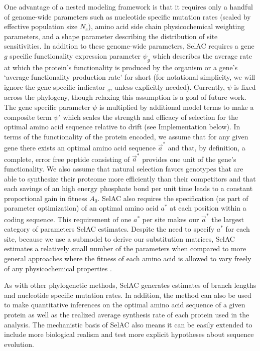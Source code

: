 \documentclass[onecolumn,letterpaper,fleqn,nogrid]{myMBE}%
\newcommand{\PC}{physicochemical\xspace}
\newcommand{\Ne}{\ensuremath{{N_e}}\xspace} %
\newcommand{\selac}{SelAC\xspace}
\newcommand{\aopt}{\ensuremath{a^*}\xspace}
\newcommand{\aoptvec}{\ensuremath{\Vec{a}^*}\xspace}
\newcommand{\psig}{\ensuremath{\psi_{g}}\xspace}
\newcommand{\psiprime}{\ensuremath{\psi'}\xspace}
\begin{document}
One advantage of a nested modeling framework is that it requires only a handful of genome-wide parameters such as nucleotide specific mutation rates (scaled by effective population size \Ne), amino acid side chain physicochemical weighting parameters, and a shape parameter describing the distribution of site sensitivities.
In addition to these genome-wide parameters, \selac requires a gene $g$ specific functionality expression parameter $\psig$ which describes the average rate at which the protein's functionality is produced by the organism or a gene's `average functionality production rate' for short (for notational simplicity, we will ignore the gene specific indicator $_g$, unless explicitly needed).
Currently, $\psi$ is fixed across the phylogeny, though relaxing this assumption is a goal of future work.
The gene specific parameter $\psi$ is multiplied by additional model terms to make a composite term $\psiprime$ which scales the strength and efficacy of selection for the optimal amino acid sequence relative to drift (see Implementation below).
In terms of the functionality of the protein encoded, we assume that for any given gene there exists an optimal amino acid sequence \aoptvec and that, by definition, a complete, error free peptide consisting of \aoptvec provides one unit of the gene's functionality.
We also assume that natural selection favors genotypes that are able to synthesize their proteome more efficiently than their competitors and that each savings of an high energy phosphate bond per unit time leads to a constant proportional gain in fitness $A_0$.
\selac also requires the specification (as part of parameter optimization) of an optimal amino acid \aopt at each position within a coding sequence.
This requirement of one \aopt per site makes our \aoptvec the largest category of parameters \selac estimates.
Despite the need to specify \aopt for each site, because we use a submodel to derive our substitution matrices, \selac estimates a relatively small number of the parameters when compared to more general approaches where the fitness of each amino acid is allowed to vary freely of any \PC properties \citep{HalpernAndBruno1998,LartillotAndPhilippe2004,RodrigueAndLartillot2014}.

As with other phylogenetic methods, \selac generates estimates of branch lengths and nucleotide specific mutation rates.
In addition, the method can also be used to make quantitative inferences on the optimal amino acid sequence of a given protein as well as the realized average synthesis rate of each protein used in the analysis.
The mechanistic basis of \selac also means it can be easily extended to include more biological realism and test more explicit hypotheses about sequence evolution.
\end{document}
